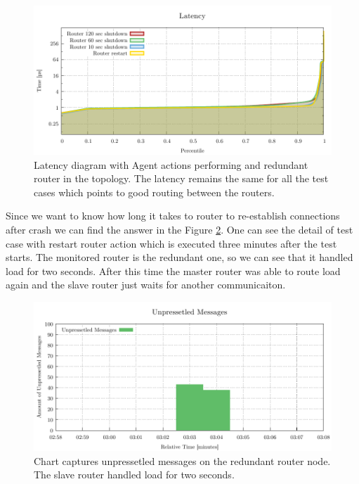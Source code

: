 \begin{figure}[H]
	\centering
	\includegraphics[width=1\linewidth]{obrazky-figures/charts/agent-redundant-latency.pdf}
	\caption{Latency diagram with Agent actions performing and redundant router in the topology. The latency remains the same for all the test cases which points to good routing between the routers.}
	\label{fig:agent-redundant-latency}
\end{figure}

Since we want to know how long it takes to router to re-establish connections after crash we can find the answer in the Figure \ref{fig:agent-redundant-unpressetled}. One can see the detail of test case with restart router action which is executed three minutes after the test starts. The monitored router is the redundant one, so we can see that it handled load for two seconds. After this time the master router was able to route load again and the slave router just waits for another communicaiton.

\begin{figure}[H]
	\centering
	\includegraphics[width=1\linewidth]{obrazky-figures/charts/restart-redundant-agent-routerLink.pdf}
	\caption{Chart captures unpressetled messages on the redundant router node. The slave router handled load for two seconds.}
	\label{fig:agent-redundant-unpressetled}
\end{figure}

